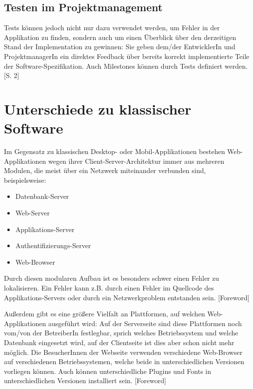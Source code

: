 \documentclass[a4paper,bibtotoc,oneside]{scrbook}
\begin{document}
\section{Testen im Projektmanagement}
Tests können jedoch nicht nur dazu verwendet werden, um Fehler in der Applikation zu finden, sondern auch um einen Überblick über den derzeitigen Stand der Implementation zu gewinnen: Sie geben dem/der EntwicklerIn und ProjektmanagerIn ein direktes Feedback über bereits korrekt implementierte Teile der Software-Spezifikation. Auch Milestones können durch Tests definiert werden. \cite{test_auto}[S. 2]





\chapter{Unterschiede zu klassischer Software}
Im Gegensatz zu klassischen Desktop- oder Mobil-Applikationen bestehen Web-Applikationen wegen ihrer Client-Server-Architektur immer aus mehreren Modulen, die meist über ein Netzwerk miteinander verbunden sind, beispielsweise: 

\begin{itemize}
\item Datenbank-Server
\item Web-Server
\item Applikations-Server
\item Authentifizierungs-Server
\item Web-Browser
\end{itemize}

Durch diesen modularen Aufbau ist es besonders schwer einen Fehler zu lokalisieren. Ein Fehler kann z.B. durch einen Fehler im Quellcode des Applikations-Servers oder durch ein Netzwerkproblem entstanden sein. \cite{testing_apps_on_web}[Foreword]

Außerdem gibt es eine größere Vielfalt an Plattformen, auf welchen Web-Applikationen ausgeführt wird: Auf der Serverseite sind diese Plattformen noch vom/von der BetreiberIn festlegbar, sprich welches Betriebssystem und welche Datenbank eingesetzt wird, auf der Clientseite ist dies aber schon nicht mehr möglich. Die BesucherInnen der Webseite verwenden verschiedene Web-Browser auf verschiedenen Betriebssystemen, welche beide in unterschiedlichen Versionen vorliegen können. Auch können unterschiedliche Plugins und Fonts in unterschiedlichen Versionen installiert sein. \cite{testing_apps_on_web}[Foreword]
\end{document}
